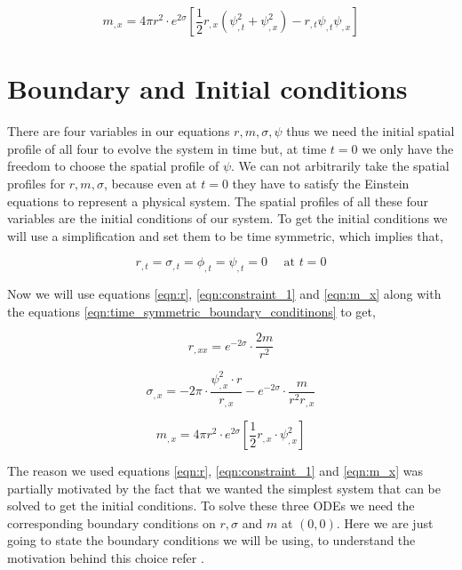 \begin{equation}
    m_{, x}=4 \pi r^{2} \cdot e^{2 \sigma}\left[\frac{1}{2} r_{, x}\left(\psi_{, t}^{2}+\psi_{, x}^{2}\right)-r_{, t} \psi_{, t} \psi_{, x}\right]
    \label{eqn:m_x}
\end{equation}

\section{Boundary and Initial conditions} \label{chap2:boundary_and_initial_conditions}



There are four variables in our equations $r,m,\sigma,\psi$ thus we need the initial spatial profile of all four to evolve the system in time but, at time $t=0$ we only have the freedom to choose the spatial profile of $\psi$. We can not arbitrarily take the spatial profiles for $r,m,\sigma$, because even at $t=0$ they have to satisfy the Einstein equations to represent a physical system. The spatial profiles of all these four variables are the initial conditions of our system. To get  the initial conditions we will use a simplification and set them  to be time symmetric, which implies that,

\begin{equation}
    r_{, t}=\sigma_{, t}=\phi_{, t}=\psi_{, t}=0 \quad \text { at } t=0
    \label{eqn:time_symmetric_boundary_conditinons}
\end{equation}

Now we will use equations \ref{eqn:r}, \ref{eqn:constraint_1} and \ref{eqn:m_x} along with the equations \ref{eqn:time_symmetric_boundary_conditinons} to get,


\begin{equation}
    r_{, x x}=e^{-2 \sigma} \cdot \frac{2 m}{r^{2}}
    \label{eqn:r_chap3}
\end{equation}


\begin{equation}
    \sigma_{, x}= -2 \pi \cdot  \frac{\psi_{, x}^{2} \cdot r}{r_{,x}}- e^{-2 \sigma} \cdot \frac{ m}{r^{2}r_{, x}}
    \label{eqn:sigma_chap3}
\end{equation}

\begin{equation}
    m_{, x}=4 \pi r^{2} \cdot e^{2 \sigma}\left[\frac{1}{2} r_{, x} \cdot \psi_{, x}^{2} \right]
\end{equation}

The reason we used equations \ref{eqn:r}, \ref{eqn:constraint_1} and \ref{eqn:m_x} was partially motivated by the fact that we wanted the simplest system that can be solved to get the initial conditions.
To solve these three ODEs we need the corresponding boundary conditions on $r,\sigma$ and $m$ at $(0,0)$. Here we are just going to state the boundary conditions we will be using, to understand the motivation behind this choice refer \citep{Guo:2013dha}.


